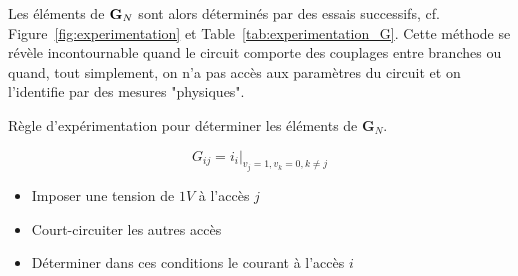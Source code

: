 Les éléments de ${\bf G}_N$ sont alors déterminés par des essais
successifs, cf. Figure~\ref{fig:experimentation} et Table~\ref{tab:experimentation_G}. Cette méthode se révèle incontournable quand le circuit comporte des couplages entre branches ou quand, tout simplement, on n'a pas accès aux paramètres du circuit et on l'identifie par des mesures "physiques".
\begin{table}[htb]
	\caption{Règle d'expérimentation pour déterminer les éléments de $\mathbf{G}_N$.}\label{tab:experimentation_G}
	\begin{boxedminipage}{\textwidth}
\[G_{ij}= i_{i}|_{v_{j}=1, v_{k}=0,k\neq j}\]
\begin{itemize}
	\item Imposer une tension de $1 V$ à l'accès $j$
	\item Court-circuiter les autres accès
	\item Déterminer dans ces conditions le courant à l'accès $i$
\end{itemize}
\end{boxedminipage}
\end{table}

